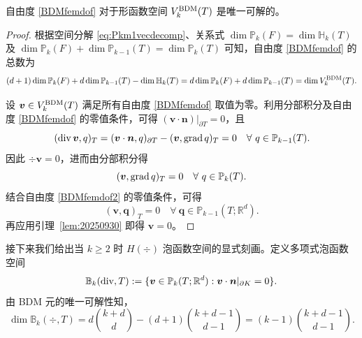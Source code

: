 \begin{lemma}\label{lem:unisovlenBDMfem}
自由度 \eqref{BDMfemdof} 对于形函数空间 $V_k^{\rm BDM}(T)$ 是唯一可解的。
\end{lemma}
\begin{proof}
根据空间分解 \eqref{eq:Pkm1vecdecomp}、关系式 $\dim\mathbb P_{k}(F)=\dim \mathbb H_{k}(T)$ 及 $\dim\mathbb P_{k}(F)+\dim\mathbb P_{k-1}(T)=\dim\mathbb P_{k}(T)$ 可知，自由度 \eqref{BDMfemdof} 的总数为
\begin{equation*}
(d+1)\dim\mathbb P_{k}(F)+d\dim\mathbb P_{k-1}(T) - \dim\mathbb H_{k}(T) = d\dim\mathbb P_{k}(F)+d\dim\mathbb P_{k-1}(T) = \dim V_k^{\rm BDM}(T).
\end{equation*}

设 $\boldsymbol{v}\in V_k^{\rm BDM}(T)$ 满足所有自由度 \eqref{BDMfemdof} 取值为零。利用分部积分及自由度 \eqref{BDMfemdof} 的零值条件，可得 $(\boldsymbol{v}\cdot\boldsymbol{n})|_{\partial T}=0$，且
\begin{equation*}
(\operatorname{div}\boldsymbol{v}, q)_T=(\boldsymbol{v}\cdot\boldsymbol{n},q)_{\partial T} - (\boldsymbol{v},\operatorname{grad} q)_T=0\quad\forall~q\in \mathbb P_{k-1}(T).
\end{equation*}
因此 $\div\boldsymbol{v}=0$，进而由分部积分得
\begin{equation*}
(\boldsymbol{v},\operatorname{grad} q)_T=0\quad\forall~q\in \mathbb P_{k}(T).
\end{equation*}
结合自由度 \eqref{BDMfemdof2} 的零值条件，可得
\begin{equation*}
(\boldsymbol v, \boldsymbol q)_T =0 \quad \forall~\boldsymbol q\in\mathbb P_{k-1}(T; \mathbb R^d).
\end{equation*}
再应用引理~\ref{lem:20250930} 即得 $\boldsymbol{v}=0$。
\end{proof}


接下来我们给出当 $k\geq2$ 时 $H(\div)$ 泡函数空间的显式刻画。定义多项式泡函数空间
\[
\mathbb B_k(\operatorname{div}, T):=\{\boldsymbol v\in\mathbb P_{k}(T;\mathbb R^d): \boldsymbol v\cdot\boldsymbol n|_{\partial K}=0\}.
\]
由 BDM 元的唯一可解性知，
\[
\dim \mathbb B_k(\div, T) = d\binom{k+d}{d} - (d+1)\binom{k+d-1}{d-1} = (k-1)\binom{k+d-1}{d-1}.
\]



